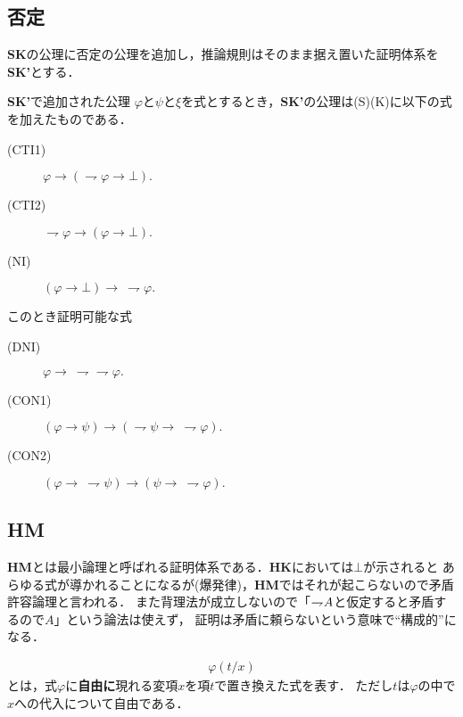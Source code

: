 \subsection{否定}
	{\bf SK}の公理に否定の公理を追加し，推論規則はそのまま据え置いた証明体系を{\bf SK'}とする．
	
	\begin{itembox}[l]{{\bf SK'}で追加された公理}
		$\varphi$と$\psi$と$\xi$を式とするとき，{\bf SK'}の公理は(S)(K)に以下の式を加えたものである．
		\begin{description}
			\item[(CTI1)] $\varphi \rightarrow (\rightharpoondown \varphi \rightarrow \bot).$
			
			\item[(CTI2)] $\rightharpoondown \varphi \rightarrow (\varphi \rightarrow \bot).$
			
			\item[(NI)] $(\varphi \rightarrow \bot) \rightarrow\ \rightharpoondown \varphi.$
		\end{description}
	\end{itembox}
	
	このとき証明可能な式
	\begin{description}
		\item[(DNI)] $\varphi \rightarrow\ \rightharpoondown \rightharpoondown \varphi.$
		\item[(CON1)] $(\varphi \rightarrow \psi) \rightarrow (\rightharpoondown \psi \rightarrow\ \rightharpoondown \varphi).$
		\item[(CON2)] $(\varphi \rightarrow\ \rightharpoondown \psi) \rightarrow (\psi \rightarrow\ \rightharpoondown \varphi).$
	\end{description}
	
\subsection{{\bf HM}}
	{\bf HM}とは最小論理と呼ばれる証明体系である．{\bf HK}においては$\bot$が示されると
	あらゆる式が導かれることになるが(爆発律)，{\bf HM}ではそれが起こらないので矛盾許容論理と言われる．
	また背理法が成立しないので「$\rightharpoondown\hspace{-0.25em} A$と仮定すると矛盾するので$A$」という論法は使えず，
	証明は矛盾に頼らないという意味で``構成的''になる．
	
	\begin{align}
		\varphi(t/x)
	\end{align}
	とは，式$\varphi$に{\bf 自由に}現れる変項$x$を項$t$で置き換えた式を表す．
	ただし$t$は$\varphi$の中で$x$への代入について自由である．
	
